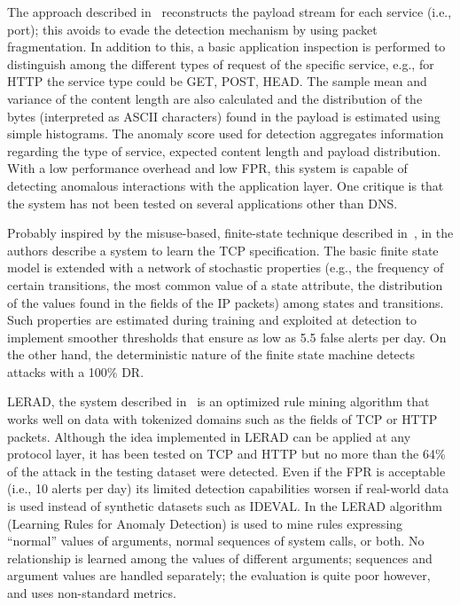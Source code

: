 The approach described in~\citep{kruegel:sac2002:anomaly} reconstructs
the payload stream for each service (i.e., port); this avoids to evade
the detection mechanism by using packet fragmentation. In addition to
this, a basic application inspection is performed to distinguish among
the different types of request of the specific service, e.g., for
\ac{HTTP} the service type could be GET, POST, HEAD. The
sample mean and variance of the content length are also calculated and
the distribution of the bytes (interpreted as \ac{ASCII}
characters) found in the payload is estimated using simple
histograms. The anomaly score used for detection aggregates
information regarding the type of service, expected content length and
payload distribution. With a low performance overhead and low
\ac{FPR}, this system is capable of detecting anomalous interactions
with the application layer. One critique is that the system has not
been tested on several applications other than \ac{DNS}.

Probably inspired by the misuse-based, finite-state technique
described in~\citep{vigna:1999:netstat}, in \citep{protocolanom} the
authors describe a system to learn the \ac{TCP} specification. The
basic finite state model is extended with a network of stochastic
properties (e.g., the frequency of certain transitions, the most
common value of a state attribute, the distribution of the values
found in the fields of the \ac{IP} packets) among states and
transitions. Such properties are estimated during training and
exploited at detection to implement smoother thresholds that ensure as
low as 5.5 false alerts per day. On the other hand, the deterministic
nature of the finite state machine detects attacks with a 100\%
\ac{DR}.

\ac{LERAD}, the system described in~\citep{rules-payl} is an optimized
rule mining algorithm that works well on data with tokenized domains
such as the fields of \ac{TCP} or \ac{HTTP}
packets. Although the idea implemented in \ac{LERAD} can be applied at
any protocol layer, it has been tested on \ac{TCP} and \ac{HTTP} but
no more than the 64\% of the attack in the testing dataset were
detected. Even if the \ac{FPR} is acceptable (i.e., 10 alerts per day)
its limited detection capabilities worsen if real-world data is used
instead of synthetic datasets such as \ac{IDEVAL}. In
\citep{rulessystemcallarguments} the \ac{LERAD} algorithm
(Learning Rules for Anomaly Detection) is used to mine rules
expressing ``normal'' values of arguments, normal sequences of system
calls, or both. No relationship is learned among the values of
different arguments; sequences and argument values are handled
separately; the evaluation is quite poor however, and uses
non-standard metrics.

